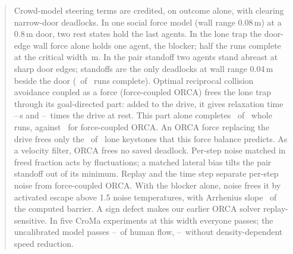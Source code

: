 \begin{abstract}
Crowd-model steering terms are credited, on outcome alone, with clearing narrow-door deadlocks. In one social force model (wall range 0.08\,m) at a 0.8\,m door, two rest states hold the last agents. In the lone trap the door-edge wall force alone holds one agent, the blocker; half the runs complete at the critical width \RevBtwoWfifty\,m. In the pair standoff two agents stand abreast at sharp door edges; standoffs are the only deadlocks at wall range 0.04\,m beside the door (\EsevenBjambK\ of \EsevenN\ runs complete). Optimal reciprocal collision avoidance coupled as a force (force-coupled ORCA) frees the lone trap through its goal-directed part: added to the drive, it gives relaxation time \RevAoneTauPrimeLo--\RevAoneTauPrimeHi\,s and \RevAoneDriveRatioLo--\RevAoneDriveRatioHi\ times the drive at rest. This part alone completes \RwOneDriveK\ of \RwOneN\ whole runs, against \RwOneOrcaK\ for force-coupled ORCA. An ORCA force replacing the drive frees only the \RzTonezeroLoneFreed\ of \RzTonezeroLoneN\ lone keystones that this force balance predicts. As a velocity filter, ORCA frees no saved deadlock. Per-step noise matched in freed fraction acts by fluctuations; a matched lateral bias tilts the pair standoff out of its minimum. Replay and the time step separate per-step noise from force-coupled ORCA. With the blocker alone, noise frees it by activated escape above 1.5 noise temperatures, with Arrhenius slope \RzTtwoRatio\ of the computed barrier. A sign defect makes our earlier ORCA solver replay-sensitive. In five CroMa experiments at this width everyone passes; the uncalibrated model passes \RevDThreeRatioMin--\RevDThreeRatioMax\ of human flow, \RvBoneCroOffMin--\RvBoneCroOffMax\ without density-dependent speed reduction.
\end{abstract}

